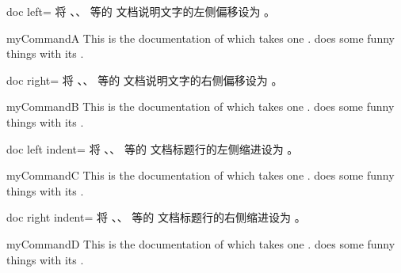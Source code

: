 \begin{docTcbKey}{doc left}{=}{\tcbdocdescInit{2em}}
  将 、、 等的
  文档说明文字的左侧偏移设为 。
\begin{dispExample}
\begin{docCommand*}[doc left=2cm,doc left indent=-2cm]{myCommandA}{}
  This is the documentation of  which takes one .
   does some funny things with its .
\end{docCommand*}
\end{dispExample}
\end{docTcbKey}

\begin{docTcbKey}{doc right}{=}{\tcbdocdescInit{0em}}
  将 、、 等的
  文档说明文字的右侧偏移设为 。
\begin{dispExample}
\begin{docCommand*}[doc right=2cm]{myCommandB}{}
  This is the documentation of  which takes one .
   does some funny things with its .
\end{docCommand*}
\end{dispExample}
\end{docTcbKey}

\begin{docTcbKey}{doc left indent}{=}{\tcbdocdescInit{-2em}}
  将 、、 等的
  文档标题行的左侧缩进设为 。
\begin{dispExample}
\begin{docCommand*}[doc left indent=2cm]{myCommandC}{}
  This is the documentation of  which takes one .
   does some funny things with its .
\end{docCommand*}
\end{dispExample}
\end{docTcbKey}


\begin{docTcbKey}{doc right indent}{=}{\tcbdocdescInit{0pt}}
  将 、、 等的
  文档标题行的右侧缩进设为 。
\begin{dispExample}
\begin{docCommand*}[doc right indent=-10mm,doc right=10mm,
    doc description=test value]{myCommandD}{}
  This is the documentation of  which takes one .
   does some funny things with its .
\end{docCommand*}
\end{dispExample}
\end{docTcbKey}

